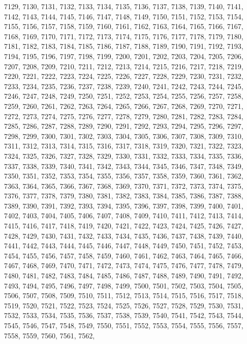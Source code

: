 7129,
7130,
7131,
7132,
7133,
7134,
7135,
7136,
7137,
7138,
7139,
7140,
7141,
7142,
7143,
7144,
7145,
7146,
7147,
7148,
7149,
7150,
7151,
7152,
7153,
7154,
7155,
7156,
7157,
7158,
7159,
7160,
7161,
7162,
7163,
7164,
7165,
7166,
7167,
7168,
7169,
7170,
7171,
7172,
7173,
7174,
7175,
7176,
7177,
7178,
7179,
7180,
7181,
7182,
7183,
7184,
7185,
7186,
7187,
7188,
7189,
7190,
7191,
7192,
7193,
7194,
7195,
7196,
7197,
7198,
7199,
7200,
7201,
7202,
7203,
7204,
7205,
7206,
7207,
7208,
7209,
7210,
7211,
7212,
7213,
7214,
7215,
7216,
7217,
7218,
7219,
7220,
7221,
7222,
7223,
7224,
7225,
7226,
7227,
7228,
7229,
7230,
7231,
7232,
7233,
7234,
7235,
7236,
7237,
7238,
7239,
7240,
7241,
7242,
7243,
7244,
7245,
7246,
7247,
7248,
7249,
7250,
7251,
7252,
7253,
7254,
7255,
7256,
7257,
7258,
7259,
7260,
7261,
7262,
7263,
7264,
7265,
7266,
7267,
7268,
7269,
7270,
7271,
7272,
7273,
7274,
7275,
7276,
7277,
7278,
7279,
7280,
7281,
7282,
7283,
7284,
7285,
7286,
7287,
7288,
7289,
7290,
7291,
7292,
7293,
7294,
7295,
7296,
7297,
7298,
7299,
7300,
7301,
7302,
7303,
7304,
7305,
7306,
7307,
7308,
7309,
7310,
7311,
7312,
7313,
7314,
7315,
7316,
7317,
7318,
7319,
7320,
7321,
7322,
7323,
7324,
7325,
7326,
7327,
7328,
7329,
7330,
7331,
7332,
7333,
7334,
7335,
7336,
7337,
7338,
7339,
7340,
7341,
7342,
7343,
7344,
7345,
7346,
7347,
7348,
7349,
7350,
7351,
7352,
7353,
7354,
7355,
7356,
7357,
7358,
7359,
7360,
7361,
7362,
7363,
7364,
7365,
7366,
7367,
7368,
7369,
7370,
7371,
7372,
7373,
7374,
7375,
7376,
7377,
7378,
7379,
7380,
7381,
7382,
7383,
7384,
7385,
7386,
7387,
7388,
7389,
7390,
7391,
7392,
7393,
7394,
7395,
7396,
7397,
7398,
7399,
7400,
7401,
7402,
7403,
7404,
7405,
7406,
7407,
7408,
7409,
7410,
7411,
7412,
7413,
7414,
7415,
7416,
7417,
7418,
7419,
7420,
7421,
7422,
7423,
7424,
7425,
7426,
7427,
7428,
7429,
7430,
7431,
7432,
7433,
7434,
7435,
7436,
7437,
7438,
7439,
7440,
7441,
7442,
7443,
7444,
7445,
7446,
7447,
7448,
7449,
7450,
7451,
7452,
7453,
7454,
7455,
7456,
7457,
7458,
7459,
7460,
7461,
7462,
7463,
7464,
7465,
7466,
7467,
7468,
7469,
7470,
7471,
7472,
7473,
7474,
7475,
7476,
7477,
7478,
7479,
7480,
7481,
7482,
7483,
7484,
7485,
7486,
7487,
7488,
7489,
7490,
7491,
7492,
7493,
7494,
7495,
7496,
7497,
7498,
7499,
7500,
7501,
7502,
7503,
7504,
7505,
7506,
7507,
7508,
7509,
7510,
7511,
7512,
7513,
7514,
7515,
7516,
7517,
7518,
7519,
7520,
7521,
7522,
7523,
7524,
7525,
7526,
7527,
7528,
7529,
7530,
7531,
7532,
7533,
7534,
7535,
7536,
7537,
7538,
7539,
7540,
7541,
7542,
7543,
7544,
7545,
7546,
7547,
7548,
7549,
7550,
7551,
7552,
7553,
7554,
7555,
7556,
7557,
7558,
7559,
7560,
7561,
7562,
